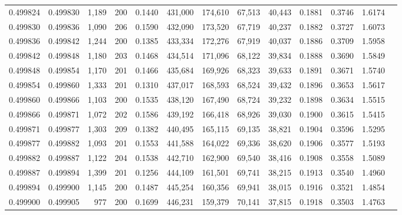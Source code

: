 \begin{tabular}{rrrrrrrrrrrrr}
0.499824 & 0.499830 & 1,189 & 200 &                                     0.1440 & 431,000 & 174,610 &  67,513 &  40,443 & 0.1881 & 0.3746 & 1.6174 \\
0.499830 & 0.499836 & 1,090 & 206 &                                     0.1590 & 432,090 & 173,520 &  67,719 &  40,237 & 0.1882 & 0.3727 & 1.6073 \\
0.499836 & 0.499842 & 1,244 & 200 &                                     0.1385 & 433,334 & 172,276 &  67,919 &  40,037 & 0.1886 & 0.3709 & 1.5958 \\
0.499842 & 0.499848 & 1,180 & 203 &                                     0.1468 & 434,514 & 171,096 &  68,122 &  39,834 & 0.1888 & 0.3690 & 1.5849 \\
0.499848 & 0.499854 & 1,170 & 201 &                                     0.1466 & 435,684 & 169,926 &  68,323 &  39,633 & 0.1891 & 0.3671 & 1.5740 \\
0.499854 & 0.499860 & 1,333 & 201 &                                     0.1310 & 437,017 & 168,593 &  68,524 &  39,432 & 0.1896 & 0.3653 & 1.5617 \\
0.499860 & 0.499866 & 1,103 & 200 &                                     0.1535 & 438,120 & 167,490 &  68,724 &  39,232 & 0.1898 & 0.3634 & 1.5515 \\
0.499866 & 0.499871 & 1,072 & 202 &                                     0.1586 & 439,192 & 166,418 &  68,926 &  39,030 & 0.1900 & 0.3615 & 1.5415 \\
0.499871 & 0.499877 & 1,303 & 209 &                                     0.1382 & 440,495 & 165,115 &  69,135 &  38,821 & 0.1904 & 0.3596 & 1.5295 \\
0.499877 & 0.499882 & 1,093 & 201 &                                     0.1553 & 441,588 & 164,022 &  69,336 &  38,620 & 0.1906 & 0.3577 & 1.5193 \\
0.499882 & 0.499887 & 1,122 & 204 &                                     0.1538 & 442,710 & 162,900 &  69,540 &  38,416 & 0.1908 & 0.3558 & 1.5089 \\
0.499887 & 0.499894 & 1,399 & 201 &                                     0.1256 & 444,109 & 161,501 &  69,741 &  38,215 & 0.1913 & 0.3540 & 1.4960 \\
0.499894 & 0.499900 & 1,145 & 200 &                                     0.1487 & 445,254 & 160,356 &  69,941 &  38,015 & 0.1916 & 0.3521 & 1.4854 \\
0.499900 & 0.499905 &   977 & 200 &                                     0.1699 & 446,231 & 159,379 &  70,141 &  37,815 & 0.1918 & 0.3503 & 1.4763 \\

\end{tabular}
